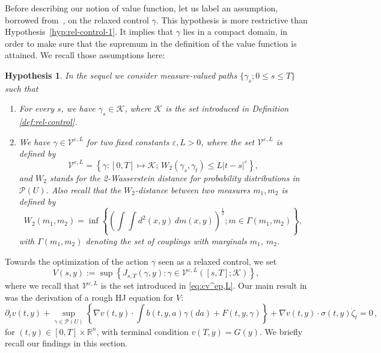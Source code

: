 \documentclass[12pt,reqno]{amsart}
\numberwithin{equation}{section}  %
\newcommand{\1}{{\bf 1}}
\newcommand{\2}{{\bf 2}}
\newcommand{\R}{\mathbb R}
\newcommand{\ck}{\mathcal K}
\newcommand{\cp}{\mathcal P}
\newcommand{\cv}{\mathcal V}
\newcommand{\ep}{\varepsilon}
\newcommand{\ga}{\gamma}
\newcommand{\gga}{\Gamma}
\newcommand{\lp}{\left(}
\newcommand{\rp}{\right)}
\newcommand{\lcl}{\left\{}
\newcommand{\rcl}{\right\}}
\newtheorem{hypothesis}[theorem]{Hypothesis}
\theoremstyle{remark}
\theoremstyle{remark}
\newcommand{\beq}{\begin{equation}}
\newcommand{\eeq}{\end{equation}}
\begin{document}
Before describing our notion of value function, let us label an assumption, borrowed from~\cite{CHT}, on the relaxed control $\ga$. This hypothesis is more restrictive than Hypothesis~\ref{hyp:rel-control-1}. It implies that $\ga$ lies in a compact domain, in order to make sure that the supremum in the definition of the value function is attained. We recall those assumptions here:
\begin{hypothesis}\label{hyp:rel-control}
In the sequel we consider measure-valued paths $\{ \ga_s; 0 \leq s \leq T \}$ such that
\begin{enumerate}[wide, labelwidth=!, labelindent=0pt, label=\textnormal{(\arabic*)}]
\setlength\itemsep{.05in}
\item For every $s$, we have $\ga_s \in \mathcal{K}$, where $\mathcal{K}$ is the set introduced in Definition \ref{def:rel-control}.
\item We have $\ga \in \cv^{\ep, L}$ for two fixed constants $\ep, L > 0$, where the set $\cv^{\ep, L}$ is defined by
\beq\label{eq:cv^ep,L}
\cv^{\ep, L} = \lcl \ga: [0,T] \mapsto \ck ; \,  W_2(\ga_s, \ga_t) \leq L|t-s|^{\ep} \rcl,
\eeq
and $W_2$ stands for the 2-Wasserstein distance for probability distributions in $\cp(U)$. Also recall that the $W_{2}$-distance between two measures $m_{1}, m_{2}$ is defined by
$$
W_2(m_1, m_2) = \inf \lcl {\lp\int \int d^2(x,y) \, dm(x,y) \rp}^{\frac{1}{2}}; m \in \gga(m_1, m_2) \rcl,
$$
with $\gga(m_1, m_2)$ denoting the set of couplings with marginals $m_1$, $m_2$.
\end{enumerate}
\end{hypothesis}
Towards the optimization of the action $\ga$ seen as a relaxed control, we set
\beq\label{eq:V_sy}
V(s,y) := \sup \lcl J_{s,T}(\ga, y): \ga \in \cv^{\ep, L}([s,T]; \ck) \rcl,
\eeq
where we recall that $\cv^{\ep, L}$ is the set introduced in \eqref{eq:cv^ep,L}. Our main result in \cite{CHT} was the derivation of a rough HJ equation for $V$:
\begin{equation}\label{d3}
\partial_t v(t,y) + \sup_{\gamma \in \mathcal P(U)} \left\{ \nabla v(t,y) \cdot \int b(t,y,a)\gamma(da) + F(t,y,\gamma) \right\} + \nabla v(t,y) \cdot \sigma(t,y)  \dot{\zeta}_t = 0 \, ,
\end{equation}
for $(t,y)\in[0,T]\times \R^n$, with terminal condition $v(T,y)=G(y)$.
We briefly recall our findings in this section.
\end{document}
